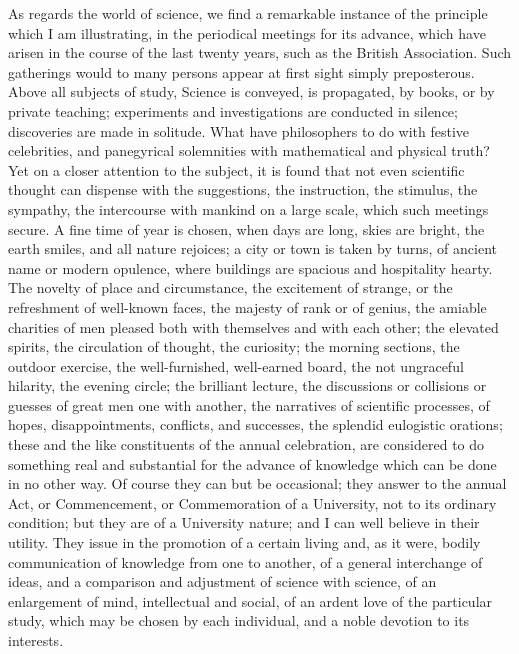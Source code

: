 As regards the world of science, we find a remarkable instance of
the principle which I am illustrating, in the periodical meetings for
its advance, which have arisen in the course of the last twenty years,
such as the British Association. Such gatherings would to many persons
appear at first sight simply preposterous. Above all subjects of
study, Science is conveyed, is propagated, by books, or by private
teaching; experiments and investigations are conducted in silence;
discoveries are made in solitude. What have philosophers to do with
festive celebrities, and panegyrical solemnities with mathematical and
physical truth? Yet on a closer attention to the subject, it is found
that not even scientific thought can dispense with the suggestions,
the instruction, the stimulus, the sympathy, the intercourse with
mankind on a large scale, which such meetings secure. A fine time of
year is chosen, when days are long, skies are bright, the earth
smiles, and all nature rejoices; a city or town is taken by turns, of
ancient name or modern opulence, where buildings are spacious and
hospitality hearty. The novelty of place and circumstance, the
excitement of strange, or the refreshment of well-known faces, the
majesty of rank or of genius, the amiable charities of men pleased
both with themselves and with each other; the elevated spirits, the
circulation of thought, the curiosity; the morning sections, the
outdoor exercise, the well-furnished, well-earned board, the not
ungraceful hilarity, the evening circle; the brilliant lecture, the
discussions or collisions or guesses of great men one with another,
the narratives of scientific processes, of hopes, disappointments,
conflicts, and successes, the splendid eulogistic orations; these and
the like constituents of the annual celebration, are considered to do
something real and substantial for the advance of knowledge which can
be done in no other way. Of course they can but be occasional; they
answer to the annual Act, or Commencement, or Commemoration of a
University, not to its ordinary condition; but they are of a
University nature; and I can well believe in their utility. They issue in the promotion of a certain living and, as it were, bodily
communication of knowledge from one to another, of a general
interchange of ideas, and a comparison and adjustment of science with
science, of an enlargement of mind, intellectual and social, of an
ardent love of the particular study, which may be chosen by each
individual, and a noble devotion to its interests.


